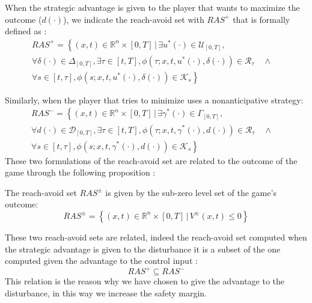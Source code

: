 When the strategic advantage is given to the player that wants to maximize the outcome ($d(\cdot)$), we indicate the reach-avoid set with $RAS^+$ that is formally defined as \cite{new_paper}:
\begin{multline}
    \label{ras_p}
    RAS^+ = 
    \left\{
        (x,t) \in \mathbb{R}^n \times [0,T] \,|\, \exists u^*(\cdot) \in \mathcal{U}_{[0, T]},
    \right.\\
    \left.
          \forall \delta(\cdot) \in \Delta_{[0, T]}, \exists \tau \in [t, T], \phi(\tau; x, t, u^*(\cdot), \delta(\cdot)) \in \mathcal{R}_\tau \quad \wedge \quad       
    \right.\\
    \left.
        \forall s \in [t, \tau], \phi(s; x, t, u^*(\cdot), \delta(\cdot)) \in \mathcal{K}_s
    \right\}
\end{multline}

Similarly, when the player that tries to minimize uses a nonanticipative strategy:
\begin{multline}
    \label{ras_m}
    RAS^- = 
    \left\{
        (x,t) \in \mathbb{R}^n \times [0,T] \,|\, \exists \gamma^*(\cdot) \in \Gamma_{[0, T]},
    \right.\\
    \left.
          \forall d(\cdot) \in \mathcal{D}_{[0, T]}, \exists \tau \in [t, T], \phi(\tau; x, t, \gamma^*(\cdot), d(\cdot)) \in \mathcal{R}_\tau \quad \wedge \quad       
    \right.\\
    \left.
        \forall s \in [t, \tau], \phi(s; x, t, \gamma^*(\cdot), d(\cdot)) \in \mathcal{K}_s
    \right\}
\end{multline}
These two formulations of the reach-avoid set are related to the outcome of the game through the following proposition \cite{new_paper}:
\begin{prop}
    \label{ras_p_m_v}
    The reach-avoid set $RAS^\pm$ is given by the sub-zero level set of the game's outcome: 
    \[
        RAS^\pm=
        \left\{
            (x, t) \in \mathbb{R}^n \times [0, T] \,|\, V^\pm(x,t) \leq 0
        \right\}
    \]
\end{prop}
These two reach-avoid sets are related, indeed the reach-avoid set computed when the strategic advantage is given to the disturbance it is a subset of the one computed given the advantage to the control input \cite{new_paper}:
\begin{equation}
    RAS^+ \subseteq RAS^-
\end{equation}
This relation is the reason why we have chosen to give the advantage to the disturbance, in this way we increase the safety margin.

